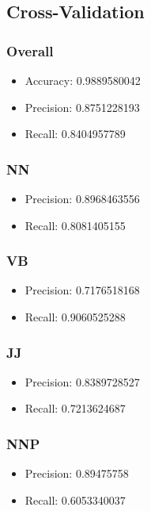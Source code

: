 \documentclass[paper=a4, fontsize=11pt]{jhwhw} %
\begin{document}
\subsection{Cross-Validation}
\subsubsection{Overall}
\begin{itemize}
\item Accuracy: 0.9889580042
\item Precision: 0.8751228193
\item Recall: 0.8404957789
\end{itemize}

\subsubsection{NN}
\begin{itemize}
\item Precision: 0.8968463556
\item Recall: 0.8081405155
\end{itemize}

\subsubsection{VB}
\begin{itemize}
\item Precision: 0.7176518168
\item Recall: 0.9060525288
\end{itemize}

\subsubsection{JJ}
\begin{itemize}
\item Precision: 0.8389728527
\item Recall: 0.7213624687
\end{itemize}

\subsubsection{NNP}
\begin{itemize}
\item Precision: 0.89475758
\item Recall: 0.6053340037
\end{itemize}
\end{document}
